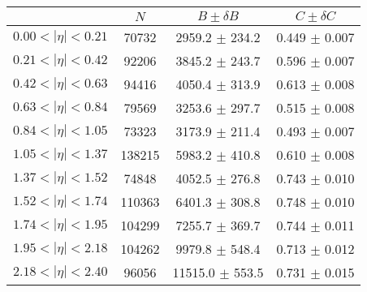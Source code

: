 \begin{tabular}{lccc}
\hline
    &   $N$   & $B \pm \delta B$  &  $C \pm \delta C$ \\
\hline
$0.00 < |\eta| <0.21$          & 70732      & 2959.2     $\pm$ 234.2 & 0.449      $\pm$ 0.007 \\
$0.21 < |\eta| <0.42$          & 92206      & 3845.2     $\pm$ 243.7 & 0.596      $\pm$ 0.007 \\
$0.42 < |\eta| <0.63$          & 94416      & 4050.4     $\pm$ 313.9 & 0.613      $\pm$ 0.008 \\
$0.63 < |\eta| <0.84$          & 79569      & 3253.6     $\pm$ 297.7 & 0.515      $\pm$ 0.008 \\
$0.84 < |\eta| <1.05$          & 73323      & 3173.9     $\pm$ 211.4 & 0.493      $\pm$ 0.007 \\
$1.05 < |\eta| <1.37$          & 138215     & 5983.2     $\pm$ 410.8 & 0.610      $\pm$ 0.008 \\
$1.37 < |\eta| <1.52$          & 74848      & 4052.5     $\pm$ 276.8 & 0.743      $\pm$ 0.010 \\
$1.52 < |\eta| <1.74$          & 110363     & 6401.3     $\pm$ 308.8 & 0.748      $\pm$ 0.010 \\
$1.74 < |\eta| <1.95$          & 104299     & 7255.7     $\pm$ 369.7 & 0.744      $\pm$ 0.011 \\
$1.95 < |\eta| <2.18$          & 104262     & 9979.8     $\pm$ 548.4 & 0.713      $\pm$ 0.012 \\
$2.18 < |\eta| <2.40$          & 96056      & 11515.0    $\pm$ 553.5 & 0.731      $\pm$ 0.015 \\
\hline
\end{tabular}
